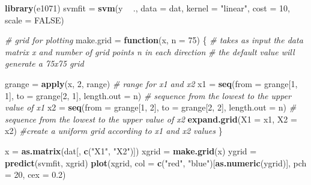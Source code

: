 \documentclass[]{article}
\newenvironment{Shaded}{\begin{snugshade}}{\end{snugshade}}
\newcommand{\CommentTok}[1]{\textcolor[rgb]{0.56,0.35,0.01}{\textit{#1}}}
\newcommand{\ControlFlowTok}[1]{\textcolor[rgb]{0.13,0.29,0.53}{\textbf{#1}}}
\newcommand{\DataTypeTok}[1]{\textcolor[rgb]{0.13,0.29,0.53}{#1}}
\newcommand{\DecValTok}[1]{\textcolor[rgb]{0.00,0.00,0.81}{#1}}
\newcommand{\FloatTok}[1]{\textcolor[rgb]{0.00,0.00,0.81}{#1}}
\newcommand{\KeywordTok}[1]{\textcolor[rgb]{0.13,0.29,0.53}{\textbf{#1}}}
\newcommand{\NormalTok}[1]{#1}
\newcommand{\OperatorTok}[1]{\textcolor[rgb]{0.81,0.36,0.00}{\textbf{#1}}}
\newcommand{\OtherTok}[1]{\textcolor[rgb]{0.56,0.35,0.01}{#1}}
\newcommand{\StringTok}[1]{\textcolor[rgb]{0.31,0.60,0.02}{#1}}
\begin{document}
\begin{Shaded}
\begin{Highlighting}[]
\KeywordTok{library}\NormalTok{(e1071)}
\NormalTok{svmfit =}\StringTok{ }\KeywordTok{svm}\NormalTok{(y }\OperatorTok{~}\StringTok{ }\NormalTok{., }\DataTypeTok{data =}\NormalTok{ dat, }\DataTypeTok{kernel =} \StringTok{"linear"}\NormalTok{, }\DataTypeTok{cost =} \DecValTok{10}\NormalTok{, }\DataTypeTok{scale =} \OtherTok{FALSE}\NormalTok{)}

\CommentTok{# grid for plotting}
\NormalTok{make.grid =}\StringTok{ }\ControlFlowTok{function}\NormalTok{(x, }\DataTypeTok{n =} \DecValTok{75}\NormalTok{) \{}
    \CommentTok{# takes as input the data matrix x and number of grid points n in each direction}
    \CommentTok{# the default value will generate a 75x75 grid}
    
\NormalTok{    grange =}\StringTok{ }\KeywordTok{apply}\NormalTok{(x, }\DecValTok{2}\NormalTok{, range)  }\CommentTok{# range for x1 and x2}
\NormalTok{    x1 =}\StringTok{ }\KeywordTok{seq}\NormalTok{(}\DataTypeTok{from =}\NormalTok{ grange[}\DecValTok{1}\NormalTok{, }\DecValTok{1}\NormalTok{], }\DataTypeTok{to =}\NormalTok{ grange[}\DecValTok{2}\NormalTok{, }\DecValTok{1}\NormalTok{], }\DataTypeTok{length.out =}\NormalTok{ n)  }\CommentTok{# sequence from the lowest to the upper value of x1}
\NormalTok{    x2 =}\StringTok{ }\KeywordTok{seq}\NormalTok{(}\DataTypeTok{from =}\NormalTok{ grange[}\DecValTok{1}\NormalTok{, }\DecValTok{2}\NormalTok{], }\DataTypeTok{to =}\NormalTok{ grange[}\DecValTok{2}\NormalTok{, }\DecValTok{2}\NormalTok{], }\DataTypeTok{length.out =}\NormalTok{ n)  }\CommentTok{# sequence from the lowest to the upper value of x2}
    \KeywordTok{expand.grid}\NormalTok{(}\DataTypeTok{X1 =}\NormalTok{ x1, }\DataTypeTok{X2 =}\NormalTok{ x2)  }\CommentTok{#create a uniform grid according to x1 and x2 values}
\NormalTok{\}}
\end{Highlighting}
\end{Shaded}

\begin{Shaded}
\begin{Highlighting}[]
\NormalTok{x =}\StringTok{ }\KeywordTok{as.matrix}\NormalTok{(dat[, }\KeywordTok{c}\NormalTok{(}\StringTok{"X1"}\NormalTok{, }\StringTok{"X2"}\NormalTok{)])}
\NormalTok{xgrid =}\StringTok{ }\KeywordTok{make.grid}\NormalTok{(x)}
\NormalTok{ygrid =}\StringTok{ }\KeywordTok{predict}\NormalTok{(svmfit, xgrid)}
\KeywordTok{plot}\NormalTok{(xgrid, }\DataTypeTok{col =} \KeywordTok{c}\NormalTok{(}\StringTok{"red"}\NormalTok{, }\StringTok{"blue"}\NormalTok{)[}\KeywordTok{as.numeric}\NormalTok{(ygrid)], }\DataTypeTok{pch =} \DecValTok{20}\NormalTok{, }\DataTypeTok{cex =} \FloatTok{0.2}\NormalTok{)}
\end{Highlighting}
\end{Shaded}
\end{document}
